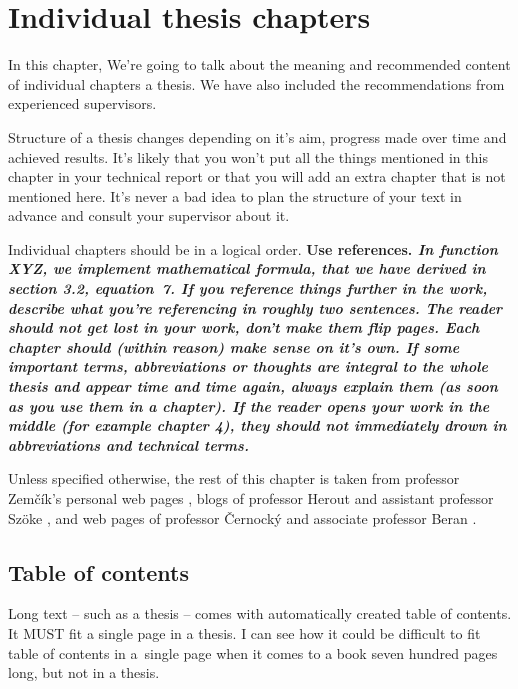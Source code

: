 \rm


\chapter{Individual thesis chapters}
\label{kapitoly}

In this chapter, We're going to talk about the meaning and recommended content of individual chapters a thesis. We have also included the recommendations from experienced supervisors. 

Structure of a thesis changes depending on it's aim, progress made over time and achieved results. It's likely that you won't put all the things mentioned in this chapter in your technical report or that you will add an extra chapter that is not mentioned here. It's never a bad idea to plan the structure of your text in advance and consult your supervisor about it.

Individual chapters should be in a logical order. \bf Use references. \rm \it In function XYZ, we implement mathematical formula, that we have derived in section 3.2, equation~7. \rm If you reference things further in the work, describe what you're referencing in roughly two sentences. The reader should not get lost in your work, don't make them flip pages. \bf Each chapter should (within reason) make sense on it's own. \rm If some important terms, abbreviations or thoughts are integral to the whole thesis and appear time and time again, always explain them (as soon as you use them in a chapter). If the reader opens your work in the middle (for example chapter 4), they should not immediately drown in abbreviations and technical terms.\cite{rady}

Unless specified otherwise, the rest of this chapter is taken from professor Zemčík's personal web pages \cite{Zemcik}, blogs of professor Herout \cite{Herout} and assistant professor Szöke \cite{rady}, and web pages of professor Černocký \cite{Cernocky} and associate professor Beran \cite{Beran}.

\section{Table of contents}
\label{obsah}

Long text -- such as a thesis -- comes with automatically created table of contents. It MUST fit a single page in a thesis. I can see how it could be difficult to fit table of contents in a~single page when it comes to a book seven hundred pages long, but not in a thesis.

